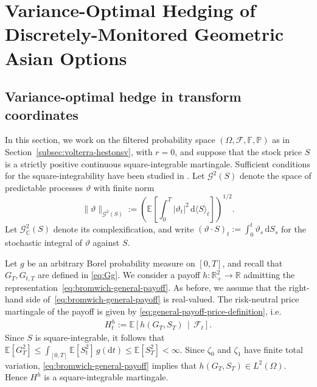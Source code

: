 \documentclass[10pt,a4paper,reqno]{amsart}
\theoremstyle{plain}
\theoremstyle{definition}
\theoremstyle{remark}
\theoremstyle{example}
\begin{document}
\section{Variance-Optimal Hedging of Discretely-Monitored Geometric Asian Options}\label{sec:hedging}


\subsection{Variance-optimal hedge in transform coordinates}
\label{subsec:volterra-block-hedge}

In this section, we work on the filtered probability space $(\Omega,\mathcal F,\mathbb F,\mathbb P)$ as in Section~\ref{subsec:volterra-hestonsv}, with $r=0$, and suppose that the stock price $S$ is a strictly positive continuous square-integrable martingale. Sufficient conditions for the square-integrability have been studied in \cite{gerhold2019moment, MR4099324}. Let $\mathcal G^2(S)$ denote the space of predictable processes $\vartheta$ with finite norm
\[
    \|\vartheta\|_{\mathcal G^2(S)} := \left( \mathbb E\left[ \int_0^T |\vartheta_t|^2\,\mathrm d\langle S\rangle_t \right] \right)^{1/2}.
\]
Let $\mathcal G^2_{\mathbb C}(S)$ denote its complexification, and write $(\vartheta\cdot S)_t := \int_0^t\vartheta_s\,\mathrm dS_s$ for the stochastic integral of $\vartheta$ against $S$.

Let $g$ be an arbitrary Borel probability measure on $[0,T]$, and recall that $G_T, G_{t,T}$ are defined in \eqref{eq:Gg}. We consider a payoff $h:\mathbb R_+^2\longrightarrow \mathbb R$ admitting the representation~\eqref{eq:bromwich-general-payoff}. As before, we assume that the right-hand side of~\eqref{eq:bromwich-general-payoff} is real-valued. The risk-neutral price martingale of the payoff is given by \eqref{eq:general-payoff-price-definition}, i.e.
\begin{align}\label{eq:Hh-hedging}
    H_t^h := \mathbb E\left[ h(G_T,S_T) \,\middle|\, \mathcal F_t \right].
\end{align}
Since $S$ is square-integrable, it follows that $\mathbb E[G_T^2] \leq \int_{[0,T]}\mathbb E[S_t^2]\,g(\mathrm dt) \leq \mathbb E[S_T^2] <\infty$. Since $\zeta_0$ and $\zeta_1$ have finite total variation, \eqref{eq:bromwich-general-payoff} implies that $h(G_T,S_T)\in L^2(\Omega)$. Hence $H^h$ is a square-integrable martingale.
\end{document}
